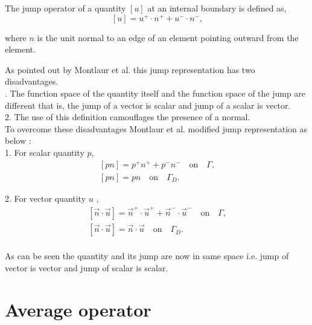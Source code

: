 \documentclass[a4paper,oneside,openright,spanish,english]{book}
\begin{document}
The jump operator of a quantity $[u]$ at an internal boundary is defined as,
\begin{equation}\label{jump operator}
[u]=u^+ \cdot n^+ + u^- \cdot n^- \textrm{,}
\end{equation}

where $n$ is the unit normal to an edge of an element pointing outward from the element.

As pointed out by Montlaur et al. \cite{Montlaur2} this jump representation has two disadvantages.\\
. The function space of the quantity itself and the function space of the jump are different that is, the jump of a vector is scalar and jump of a scalar is vector.\\
2. The use of this definition camouflages the presence of a normal.\\

To overcome these disadvantages Montlaur et al. \cite{Montlaur2} modified jump representation as below :\\

1.  For scalar quantity $p$,
\begin{equation}
\begin{split}
[pn] = p^+ n^+ + p^- n^- \quad \textrm{on} \quad \Gamma \textrm{,}\\
[pn] = p n \quad \textrm{on} \quad \Gamma_D \textrm{.}
\end{split}
\end{equation}

2. For vector quantity $u$ ,
\begin{equation}
\begin{split}
[\overrightarrow{n} \cdot \overrightarrow{u}] = \overrightarrow{n}^+ \cdot \overrightarrow{u}^+ + \overrightarrow{n}^- \cdot \overrightarrow{u}^- \quad \textrm{on} \quad \Gamma \textrm{,}\\
[\overrightarrow{n} \cdot \overrightarrow{u}] = \overrightarrow{n} \cdot \overrightarrow{u} \quad \textrm{on} \quad \Gamma_D \textrm{.}\\
\end{split}
\end{equation}

As can be seen the quantity and its jump are now in same space i.e. jump of vector is vector and jump of scalar is scalar.

\section{Average operator}
\end{document}
